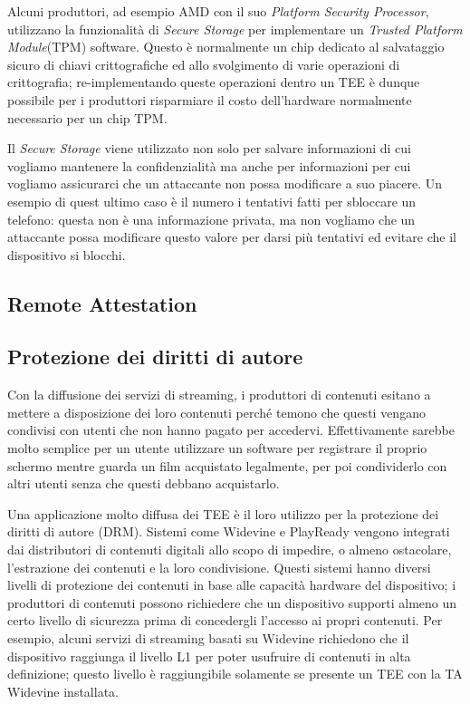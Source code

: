 \documentclass[12pt,italian]{report}
\begin{document}
Alcuni produttori, ad esempio AMD con il suo
\textit{Platform Security Processor}, utilizzano la
funzionalità di \textit{Secure Storage} per implementare un
\textit{Trusted Platform Module}(TPM) software\cite{amd2020ftpm}.
Questo è normalmente un chip dedicato al salvataggio sicuro di chiavi crittografiche
ed allo svolgimento di varie operazioni di crittografia; re-implementando
queste operazioni dentro un TEE è dunque possibile per i produttori risparmiare
il costo dell'hardware normalmente necessario per un chip TPM.

Il \textit{Secure Storage} viene utilizzato non solo per salvare
informazioni di cui vogliamo mantenere la confidenzialità ma anche per
informazioni per cui vogliamo assicurarci che un attaccante non possa
modificare a suo piacere.
Un esempio di quest ultimo caso è il numero i tentativi fatti per sbloccare
un telefono: questa non è una informazione privata, ma non vogliamo che un
attaccante possa modificare questo valore per darsi più tentativi ed evitare
che il dispositivo si blocchi.


\subsection{Remote Attestation}
\label{subsec:remote-attestation}


\subsection{Protezione dei diritti di autore}
\label{subsec:drm}
Con la diffusione dei servizi di streaming, i produttori di contenuti esitano
a mettere a disposizione dei loro contenuti perché temono che questi vengano
condivisi con utenti che non hanno pagato per accedervi.
Effettivamente sarebbe molto semplice per un utente utilizzare un software per
registrare il proprio schermo mentre guarda un film acquistato legalmente, per
poi condividerlo con altri utenti senza che questi debbano acquistarlo.

Una applicazione molto diffusa dei TEE è il loro utilizzo per la protezione
dei diritti di autore (DRM). 
Sistemi come Widevine\cite{widevine} e PlayReady\cite{playready} vengono
integrati dai distributori di contenuti digitali allo scopo di impedire, o
almeno ostacolare, l'estrazione dei contenuti e la loro condivisione.
Questi sistemi hanno diversi livelli di protezione dei contenuti in base alle
capacità hardware del dispositivo; i produttori di contenuti possono richiedere
che un dispositivo supporti almeno un certo livello di sicurezza prima di
concedergli l'accesso ai propri contenuti.
Per esempio, alcuni servizi di streaming basati su Widevine richiedono che il
dispositivo raggiunga il livello L1 per poter usufruire di contenuti in alta
definizione; questo livello è raggiungibile solamente se presente un TEE con
la TA Widevine installata.
\end{document}
